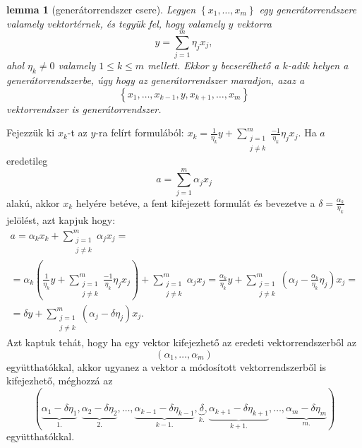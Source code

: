 \documentclass[9pt, showtrims]{memoir}
\makeatletter
\renewenvironment{proof}[1][\proofname]
    {\par\pushQED{\qed}%
    \normalfont \topsep6\p@\@plus6\p@\relax
    \trivlist
    \item[\hskip\labelsep
        \itshape
    #1\@addpunct{:}]\ignorespaces}
    {\popQED\endtrivlist\@endpefalse}
\theoremstyle{plain}
\newtheorem{lemma}[proposition]{lemma}
\theoremstyle{remark}
\theoremstyle{definition}
\makeatother
\begin{document}
\begin{lemma}[generátorrendszer csere]\label{le:gencsere}
    Legyen $\left\{ x_1,\dots,x_m \right\}$ egy generátorrendszere valamely vektortérnek,
    és tegyük fel, hogy valamely $y$ vektorra
    \[
        y=\sum_{j=1}^m\eta_jx_j,
    \]
    ahol $\eta_k\neq 0$ valamely $1\leq k\leq m$ mellett. 
    Ekkor $y$ becserélhető a $k$-adik helyen a generátorrendszerbe, 
    úgy hogy az generátorrendszer maradjon, azaz a
    \[
        \left\{ x_1,\dots,x_{k-1},y,x_{k+1},\dots,x_m \right\}
    \]
    vektorrendszer is generátorrendszer.
\end{lemma}
\begin{proof}
    Fejezzük ki $x_k$-t az $y$-ra felírt formulából:
    \(
    x_k=\frac{1}{\eta_k}y+\sum_{\substack{j=1\\j\neq k}}^m\frac{-1}{\eta_k}\eta_jx_j.
    \)
    Ha $a$ eredetileg 
    \[
        a=\sum_{j=1}^m\alpha_jx_j
    \]
    alakú, akkor $x_k$ helyére betéve, a fent kifejezett formulát és bevezetve a 
    $\delta=\frac{\alpha_k}{\eta_k}$ jelölést, azt kapjuk hogy:
    \begin{multline*}
        a=\alpha_kx_k+\sum_{\substack{j=1\\j\neq k}}^m\alpha_jx_j=
        \\
        =
        \alpha_k
        \left( 
        \frac{1}{\eta_k}y+\sum_{\substack{j=1\\j\neq k}}^m\frac{-1}{\eta_k}\eta_jx_j
        \right)
        +\sum_{\substack{j=1\\j\neq k}}^m\alpha_jx_j
        =
        \frac{\alpha_k}{\eta_k}y+
        \sum_{\substack{j=1\\j\neq k}}^m\left( \alpha_j-\frac{\alpha_k}{\eta_k}\eta_j \right)x_j=
        \\
        =\delta y+
        \sum_{\substack{j=1\\j\neq k}}^m\left( \alpha_j-\delta\eta_j \right)x_j.
    \end{multline*}
    Azt kaptuk tehát, hogy ha egy vektor kifejezhető az eredeti vektorrendszerből az 
    \[
        \left( \alpha_1,\dots,\alpha_m \right) 
    \]
    együtthatókkal, akkor ugyanez a vektor a módosított vektorrendszerből is kifejezhető,
    méghozzá az 
    \[
        \left( 
        \underbrace{\alpha_1-\delta\eta_1}_{1.},
        \underbrace{\alpha_2-\delta\eta_2}_{2.},
        \dots,
        \underbrace{\alpha_{k-1}-\delta\eta_{k-1}}_{k-1.},
        \underbrace{\delta}_{k.},
        \underbrace{\alpha_{k+1}-\delta\eta_{k+1}}_{k+1.},\dots,
        \underbrace{\alpha_m-\delta\eta_m}_{m.}
        \right)
    \]
    együtthatókkal.
\end{proof}
\end{document}
